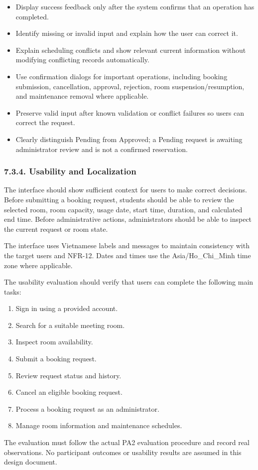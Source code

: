 \begin{itemize}
\item
  Display success feedback only after the system confirms that an
  operation has completed.
\item
  Identify missing or invalid input and explain how the user can correct
  it.
\item
  Explain scheduling conflicts and show relevant current information
  without modifying conflicting records automatically.
\item
  Use confirmation dialogs for important operations, including booking
  submission, cancellation, approval, rejection, room
  suspension/resumption, and maintenance removal where applicable.
\item
  Preserve valid input after known validation or conflict failures so
  users can correct the request.
\item
  Clearly distinguish Pending from Approved; a Pending request is
  awaiting administrator review and is not a confirmed reservation.
\end{itemize}

\subsubsection{7.3.4. Usability and
Localization}\label{usability-and-localization}

The interface should show sufficient context for users to make correct
decisions. Before submitting a booking request, students should be able
to review the selected room, room capacity, usage date, start time,
duration, and calculated end time. Before administrative actions,
administrators should be able to inspect the current request or room
state.

The interface uses Vietnamese labels and messages to maintain
consistency with the target users and NFR-12. Dates and times use the
Asia/Ho\_Chi\_Minh time zone where applicable.

The usability evaluation should verify that users can complete the
following main tasks:

\begin{enumerate}
\def\labelenumi{\arabic{enumi}.}
\item
  Sign in using a provided account.
\item
  Search for a suitable meeting room.
\item
  Inspect room availability.
\item
  Submit a booking request.
\item
  Review request status and history.
\item
  Cancel an eligible booking request.
\item
  Process a booking request as an administrator.
\item
  Manage room information and maintenance schedules.
\end{enumerate}

The evaluation must follow the actual PA2 evaluation procedure and
record real observations. No participant outcomes or usability results
are assumed in this design document.
